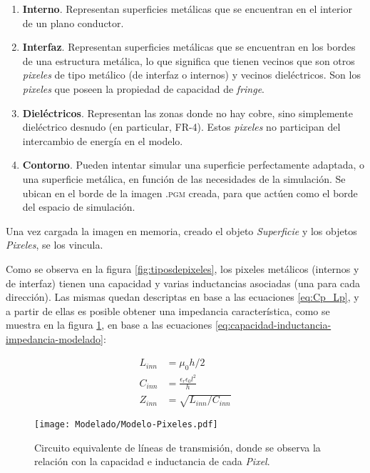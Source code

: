 \begin{enumerate}
	\item \textbf{Interno}. Representan superficies metálicas que se encuentran en el interior de un plano conductor.
	\item \textbf{Interfaz}. Representan superficies metálicas que se encuentran en los bordes de una estructura metálica, lo que significa que tienen vecinos que son otros \textit{pixeles} de tipo metálico (de interfaz o internos) y vecinos dieléctricos. Son los \textit{pixeles} que poseen la propiedad de capacidad de \textit{fringe}.
	\item \textbf{Dieléctricos}. Representan las zonas donde no hay cobre, sino simplemente dieléctrico desnudo (en particular, FR-4). Estos \textit{pixeles} no participan del intercambio de energía en el modelo.
	\item \textbf{Contorno}. Pueden intentar simular una superficie perfectamente adaptada, o una superficie metálica, en función de las necesidades de la simulación. Se ubican en el borde de la imagen \textsc{.pgm} creada, para que actúen como el borde del espacio de simulación.
\end{enumerate}


Una vez cargada la imagen en memoria, creado el objeto \textit{Superficie} y los objetos \textit{Pixeles}, se los vincula.

Como se observa en la figura \ref{fig:tiposdepixeles}, los pixeles metálicos (internos y de interfaz) tienen una capacidad y varias inductancias asociadas (una para cada dirección). Las mismas quedan descriptas en base a las ecuaciones \ref{eq:Cp_Lp}, y a partir de ellas es posible obtener una impedancia característica, como se muestra en la figura \ref{fig:modelo-con-lineas-de-transmision}, en base a las ecuaciones \ref{eq:capacidad-inductancia-impedancia-modelado}:

\begin{subequations}
	\label{eq:capacidad-inductancia-impedancia-modelado}
	\begin{align}
		L_{inn} &= \mu_0 h /2 \\
		C_{inn} &= \frac{\epsilon_r \epsilon_0 l^2}{h} \\
		Z_{inn} &= \sqrt{L_{inn} / C_{inn}}
	\end{align}
\end{subequations}

\begin{figure}[h]
	\centering
	\texttt{[image: Modelado/Modelo-Pixeles.pdf]}
	\caption{Circuito equivalente de líneas de transmisión, donde se observa la relación con la capacidad e inductancia de cada \textit{Pixel}.}
	\label{fig:modelo-con-lineas-de-transmision}
\end{figure}

